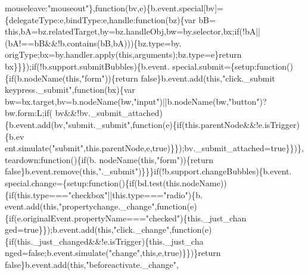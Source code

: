\begin{DoxyCode}
      mouseleave:\textcolor{stringliteral}{"mouseout"}\},\textcolor{keyword}{function}(bv,e)\{b.event.special[bv]=\{delegateType:e,bindType:e,handle:\textcolor{keyword}{function}(bz)\{var bB=\textcolor{keyword}{
      this},bA=bz.relatedTarget,by=bz.handleObj,bw=by.selector,bx;\textcolor{keywordflow}{if}(!bA||(bA!==bB&&!b.contains(bB,bA)))\{bz.type=by.
      origType;bx=by.handler.apply(\textcolor{keyword}{this},arguments);bz.type=e\}\textcolor{keywordflow}{return} bx\}\}\});\textcolor{keywordflow}{if}(!b.support.submitBubbles)\{b.event.
      special.submit=\{setup:\textcolor{keyword}{function}()\{\textcolor{keywordflow}{if}(b.nodeName(\textcolor{keyword}{this},\textcolor{stringliteral}{"form"}))\{\textcolor{keywordflow}{return} \textcolor{keyword}{false}\}b.event.add(\textcolor{keyword}{this},\textcolor{stringliteral}{"click.\_submit
       keypress.\_submit"},\textcolor{keyword}{function}(bx)\{var bw=bx.target,bv=b.nodeName(bw,\textcolor{stringliteral}{"input"})||b.nodeName(bw,\textcolor{stringliteral}{"button"})?bw.form:L;\textcolor{keywordflow}{if}(
      bv&&!bv.\_submit\_attached)\{b.event.add(bv,\textcolor{stringliteral}{"submit.\_submit"},\textcolor{keyword}{function}(e)\{\textcolor{keywordflow}{if}(this.parentNode&&!e.isTrigger)\{b.ev
      ent.simulate(\textcolor{stringliteral}{"submit"},this.parentNode,e,true)\}\});bv.\_submit\_attached=\textcolor{keyword}{true}\}\})\},teardown:\textcolor{keyword}{function}()\{\textcolor{keywordflow}{if}(b.
      nodeName(\textcolor{keyword}{this},\textcolor{stringliteral}{"form"}))\{\textcolor{keywordflow}{return} \textcolor{keyword}{false}\}b.event.remove(\textcolor{keyword}{this},\textcolor{stringliteral}{".\_submit"})\}\}\}\textcolor{keywordflow}{if}(!b.support.changeBubbles)\{b.event.
      special.change=\{setup:\textcolor{keyword}{function}()\{\textcolor{keywordflow}{if}(bd.test(\textcolor{keyword}{this}.nodeName))\{\textcolor{keywordflow}{if}(this.type===\textcolor{stringliteral}{"checkbox"}||this.type===\textcolor{stringliteral}{"radio"})\{b.
      event.add(\textcolor{keyword}{this},\textcolor{stringliteral}{"propertychange.\_change"},\textcolor{keyword}{function}(e)\{\textcolor{keywordflow}{if}(e.originalEvent.propertyName===\textcolor{stringliteral}{"checked"})\{this.\_just\_chan
      ged=true\}\});b.event.add(\textcolor{keyword}{this},\textcolor{stringliteral}{"click.\_change"},\textcolor{keyword}{function}(e)\{\textcolor{keywordflow}{if}(this.\_just\_changed&&!e.isTrigger)\{this.\_just\_cha
      nged=false;b.event.simulate(\textcolor{stringliteral}{"change"},this,e,true)\}\})\}\textcolor{keywordflow}{return} \textcolor{keyword}{false}\}b.event.add(\textcolor{keyword}{this},\textcolor{stringliteral}{"beforeactivate.\_change"},\textcolor{keyword}{
}
\end{DoxyCode}
